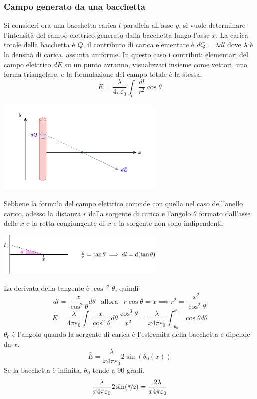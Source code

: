 \documentclass[10pt, letterpaper]{report}
\begin{document}
\subsubsection{Campo generato da una bacchetta }
Si consideri ora una bacchetta carica $l$ parallela all'asse $y$, si vuole determinare l'intensità del campo elettrico generato dalla bacchetta lungo l'asse $x$. La carica totale della bacchetta è $Q$, il contributo di carica elementare è $dQ=\lambda dl$ dove $\lambda$ è la densità di carica, assunta uniforme.\acc 
In questo caso i contributi elementari del campo elettrico $d\bar E$ su un punto avranno, visualizzati insieme come vettori, una forma triangolare, e la formulazione del campo totale è la stessa. 
$$ \bar E = \frac{\lambda}{4\pi\varepsilon_0}\int_l\frac{dl}{r^2}\cos\theta$$
\begin{center}
    \includegraphics[width=0.6\textwidth]{images/bacchettaCarica.pdf}
\end{center}
Sebbene la formula del campo elettrico coincide con quella nel caso dell'anello carico, adesso la distanza $r$ dalla sorgente di carica e l'angolo $\theta$ formato dall'asse delle $x$ e la retta congiungente di  $x$ e la sorgente non sono indipendenti.
\begin{center}
    \includegraphics[width=0.6\textwidth]{images/tan.eps}
\end{center}
La derivata della tangente è $\cos^{-2}\theta$, quindi $$ dl=\frac{x}{\cos^2\theta}d\theta
\ \ \text{ allora } \ \ 
 r\cos\theta=x\implies r^2=\frac{x^2}{\cos^2\theta}$$
$$ \bar E = \frac{\lambda}{4\pi\varepsilon_0}\int \frac{x}{\cos^2\theta}d\theta\frac{\cos^3\theta}{x^2}=\frac{\lambda}{x4\pi\varepsilon_0}\int_{-\theta_0}^{\theta_0}\cos\theta d\theta$$
$\theta_0$ è l'angolo quando la sorgente di carica è l'estremita della bacchetta e dipende da $x$.
$$ \bar E =\frac{\lambda}{x4\pi\varepsilon_0}2\sin(\theta_0(x)) $$
Se la bacchetta è infinita, $\theta_0$ tende a 90 gradi. 
$$ \frac{\lambda}{x4\pi\varepsilon_0}2\sin(\nicefrac{\pi}{2})=\frac{2\lambda}{x4\pi\varepsilon_0}$$
\end{document}
